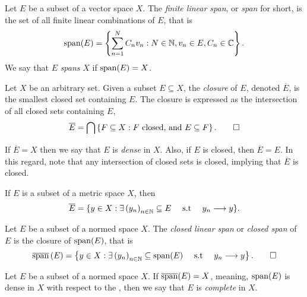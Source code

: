 \documentclass[../thesis.tex]{subfiles}
\begin{document}
\begin{definition}[Span]\label{def:span}  %
    Let $E$ be a subset of a vector space $X$. The \emph{finite linear span}, or \emph{span} for short, is the set of all finite linear combinations of $E$, that is
    \begin{equation*}
        \operatorname{span}(E)=\left\{\sum_{n=1}^N C_n v_n : N \in \mathbb{N}, v_n \in E, C_n \in \mathbb{C}\right\}.
    \end{equation*}
    We say that $E$ \emph{spans} $X$ if $\operatorname{span}(E) = X$.
\end{definition}

\begin{definition}[Closure]\label{def:closure}  %
    Let $X$ be an arbitrary set. Given a subset $E \subseteq X$, the \emph{closure} of $E$, denoted $\overline{E}$, is the smallest closed set containing $E$. The closure is expressed as the intersection of all closed sets containing $E$,
    \begin{equation*}
        \overline{E} = \bigcap \left\{F \subseteq X : F \text{ closed, and } E \subseteq F\right\}. \qedhere
    \end{equation*}
\end{definition}
If $\overline{E} = X$ then we say that $E$ is \emph{dense} in $X$. Also, if $E$ is closed, then $\overline{E}=E$. In this regard, note that any intersection of closed sets is closed, implying that $\overline{E}$ is closed.
\begin{remark} %
    If $E$ is a subset of a metric space $X$, then
    \begin{equation*} %
        \overline{E} = \{ y \in X : \exists \space \bracMed{y_n}_{n\in \N} \subseteq E \quad \text{ s.t }\quad y_n \longrightarrow y\}.
    \end{equation*}
\end{remark}

\begin{definition}\label{def:closed_span}  %
    Let $E$ be a subset of a normed space $X$. The \emph{closed linear span} or \emph{closed span} of $E$ is the closure of $\operatorname{span}(E)$, that is
    \begin{equation*}
        \overline{\operatorname{span}}\left(E\right) = \left\{y\in X: \exists \space \left(y_n\right)_{n\in \mathbb{N}} \subseteq \operatorname{span}(E) \quad \text{ s.t } \quad y_n \longrightarrow y\right\}. \qedhere
    \end{equation*}
\end{definition}

\begin{definition}[Complete]\label{def:complete}  %
    Let $E$ be a subset of a normed space $X$. If $\overline{\operatorname{span}}(E) = X$, meaning, $\operatorname{span}(E)$ is dense in $X$ with respect to the \GenNormX, then we say that $E$ is \emph{complete} in $X$.  %
\end{definition}
\end{document}

